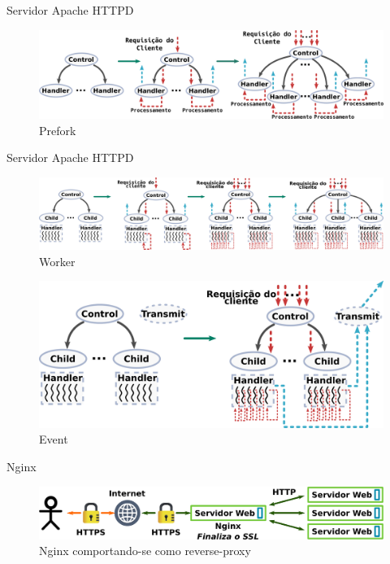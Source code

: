 \documentclass[xcolor={usenames,svgnames,dvipsnames},brazil,english,12pt,aspectratio=149]{beamer}
\begin{document}
\begin{frame}{Servidor Apache HTTPD}
  \begin{figure}[!h]
    \centering
    \includegraphics[width=\textwidth]{prefork} 
    \caption*{Prefork}
  \end{figure}
\end{frame}

\begin{frame}{Servidor Apache HTTPD}
  \begin{figure}[!h]
    \centering
    \includegraphics[width=\textwidth]{worker} 
    \caption*{Worker}
  \end{figure}
\addvspace{-20pt}
  \begin{figure}[!h]
    \centering
    \includegraphics[width=.5\textwidth]{event} 
    \caption*{Event}
  \end{figure}
\end{frame}

\begin{frame}{Nginx}
  \begin{figure}[!h]
    \centering
    \includegraphics[width=\textwidth]{nginx_load_balancer_ex} 
    \caption*{Nginx comportando-se como reverse-proxy}
  \end{figure}
\end{frame}
\end{document}
